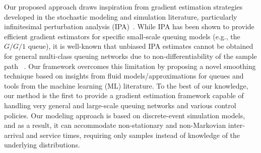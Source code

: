 Our proposed approach draws inspiration from gradient estimation strategies developed in the stochastic modeling and simulation literature, particularly infinitesimal perturbation analysis (IPA)~\cite{glasserman1990gradient, ho1983infinitesimal, johnson1989infinitesimal}. While IPA has been shown to provide efficient gradient estimators for specific small-scale queuing models (e.g., the $G/G/1$ queue), it is well-known that unbiased IPA estimates cannot be obtained for general multi-class queuing networks due to non-differentiability of the sample path ~\citep{cao1987first,fu1994smoothed,fu2012conditional}. Our framework overcomes this limitation by proposing a novel smoothing technique based on insights from fluid models/approximations for queues and tools from the machine learning (ML) literature. To the best of our knowledge, our method is the first to provide a gradient estimation framework capable of handling very general and large-scale queuing networks and various control policies. Our modeling approach is based on discrete-event simulation models, and as a result, it can accommodate non-stationary and non-Markovian inter-arrival and service times, requiring only samples instead of knowledge of the underlying distributions. 

